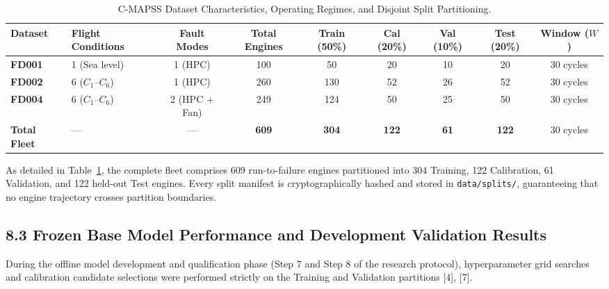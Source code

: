 \documentclass[12pt,a4paper]{article}
\begin{document}
\begin{table}[htbp]
\centering
\caption{C-MAPSS Dataset Characteristics, Operating Regimes, and Disjoint Split Partitioning.}
\label{tab:dataset_splits}
\small
\begin{tabularx}{\textwidth}{llccccccc}
\toprule
\textbf{Dataset} & \textbf{Flight Conditions} & \textbf{Fault Modes} & \textbf{Total Engines} & \textbf{Train (50\%)} & \textbf{Cal (20\%)} & \textbf{Val (10\%)} & \textbf{Test (20\%)} & \textbf{Window ($W$)} \\
\midrule
\textbf{FD001} & 1 (Sea level) & 1 (HPC) & 100 & 50 & 20 & 10 & 20 & 30 cycles \\
\textbf{FD002} & 6 ($C_1$--$C_6$) & 1 (HPC) & 260 & 130 & 52 & 26 & 52 & 30 cycles \\
\textbf{FD004} & 6 ($C_1$--$C_6$) & 2 (HPC + Fan) & 249 & 124 & 50 & 25 & 50 & 30 cycles \\
\midrule
\textbf{Total Fleet} & --- & --- & \textbf{609} & \textbf{304} & \textbf{122} & \textbf{61} & \textbf{122} & 30 cycles \\
\bottomrule
\end{tabularx}
\end{table}

As detailed in Table~\ref{tab:dataset_splits}, the complete fleet comprises 609 run-to-failure engines partitioned into 304 Training, 122 Calibration, 61 Validation, and 122 held-out Test engines. Every split manifest is cryptographically hashed and stored in \texttt{data/splits/}, guaranteeing that no engine trajectory crosses partition boundaries.

\subsection*{8.3 Frozen Base Model Performance and Development Validation Results}
During the offline model development and qualification phase (Step 7 and Step 8 of the research protocol), hyperparameter grid searches and calibration candidate selections were performed strictly on the Training and Validation partitions [4], [7].
\end{document}
